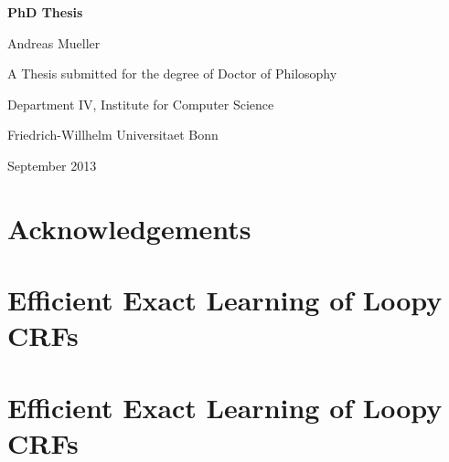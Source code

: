 \documentclass[12pt,toc=bibnumbered, a4paper,twoside]{scrreprt}
\begin{document}


\begin{titlepage}
\begin{center}
\vspace*{1in}
\textbf{{\LARGE PhD Thesis}}
\par
\vspace{1.5in} {\large Andreas Mueller}
 \par \vfill A Thesis submitted for the degree of Doctor of Philosophy
\par \vspace{0.5in}
Department IV, Institute for Computer Science
\par \vspace{0.5in}
Friedrich-Willhelm Universitaet Bonn \par
\vspace{0.5in} September 2013 \end{center}

\end{titlepage}


\tableofcontents

\chapter*{Acknowledgements}

\begin{abstract} abstract
\end{abstract}


\chapter{Efficient Exact Learning of Loopy CRFs}


\chapter{Efficient Exact Learning of Loopy CRFs}
\end{document}
